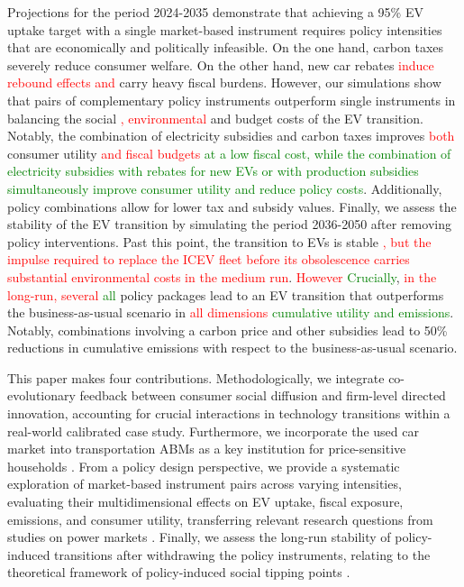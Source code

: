 \documentclass[12pt]{article}
\begin{document}
Projections for the period 2024-2035 demonstrate that achieving a 95\% EV uptake target with a single market-based instrument requires policy intensities that are economically and politically infeasible. On the one hand, carbon taxes severely reduce consumer welfare. On the other hand, new car rebates \textcolor{red}{induce rebound effects and} carry heavy fiscal burdens. However, our simulations show that pairs of complementary policy instruments outperform single instruments in balancing the social \textcolor{red}{, environmental} and budget costs of the EV transition. Notably, the combination of electricity subsidies and carbon taxes improves \textcolor{red}{both} consumer utility \textcolor{red}{and fiscal budgets} \textcolor{green}{at a low fiscal cost, while the combination of electricity subsidies with rebates for new EVs or with production subsidies simultaneously improve consumer utility and reduce policy costs}. Additionally, policy combinations allow for lower tax and subsidy values. Finally, we assess the stability of the EV transition by simulating the period 2036-2050 after removing policy interventions. Past this point, the transition to EVs is stable \textcolor{red}{, but the impulse required to replace the ICEV fleet before its obsolescence carries substantial environmental costs in the medium run}. \textcolor{red}{However} \textcolor{green}{Crucially}, \textcolor{red}{in the long-run, several} \textcolor{green}{all} policy packages lead to an EV transition that outperforms the business-as-usual scenario in \textcolor{red}{all dimensions} \textcolor{green}{cumulative utility and emissions}. Notably, combinations involving a carbon price and other subsidies lead to 50\% reductions in cumulative emissions with respect to the business-as-usual scenario.%

This paper makes four contributions. Methodologically, we integrate co-evolutionary feedback between consumer social diffusion and firm-level directed innovation, accounting for crucial interactions in technology transitions \citep{dijk2013incorporating} within a real-world calibrated case study. Furthermore, we incorporate the used car market into transportation ABMs as a key institution for price-sensitive households \citep{Muehlegger2018Understanding}. From a policy design perspective, we provide a systematic exploration of market-based instrument pairs across varying intensities, evaluating their multidimensional effects on EV uptake, fiscal exposure, emissions, and consumer utility, transferring relevant research questions from studies on power markets \citep{savin2022agent,nunez2022beyond}. Finally, we assess the long-run stability of policy-induced transitions after withdrawing the policy instruments, relating to the theoretical framework of policy-induced social tipping points \citep{vanderPloeg2025}.
\end{document}
